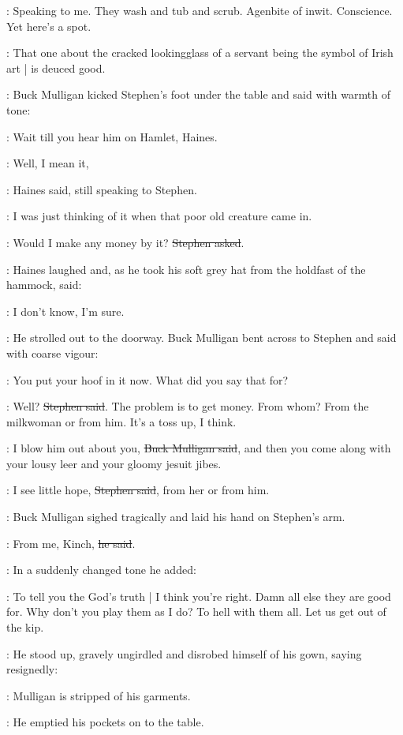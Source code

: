 \StephenInt:
Speaking to me.
They wash and tub and scrub.
Agenbite of inwit.
Conscience.
Yet here's a spot.

\Haines:
That one about the cracked lookingglass of a servant
being the symbol of Irish art |
is deuced good.

:
Buck Mulligan kicked Stephen's foot under the table
and said with warmth of tone:

\Mulligan:
Wait till you hear him on Hamlet, Haines.

\Haines:
Well, I mean it,

:
Haines said, still speaking to Stephen.

\Haines:
I was just thinking of it when that poor old creature came in.

\Stephen:
Would I make any money by it?
\sout{Stephen asked}.

:
Haines laughed
and, as he took his soft grey hat from the holdfast of the hammock,
said:

\Haines:
I don't know, I'm sure.

:
He strolled out to the doorway.
Buck Mulligan bent across to Stephen
and said with coarse vigour:

\Mulligan:
You put your hoof in it now.
What did you say that for?

\Stephen:
Well?
\sout{Stephen said}.
The problem is to get money.
From whom?
From the milkwoman or from him.
It's a toss up, I think.

\Mulligan:
I blow him out about you,
\sout{Buck Mulligan said},
and then you come along
with your lousy leer and your gloomy jesuit jibes.

\Stephen:
I see little hope,
\sout{Stephen said},
from her or from him.

:
Buck Mulligan sighed tragically and laid his hand on Stephen's arm.

\Mulligan:
From me, Kinch,
\sout{he said}.

:
In a suddenly changed tone he added:

\Mulligan:
To tell you the God's truth |
I think you're right.
Damn all else they are good for.
Why don't you play them as I do?
To hell with them all.
Let us get out of the kip.

:
He stood up,
gravely ungirdled and disrobed himself of his gown,
saying resignedly:

\Mulligan:
Mulligan is stripped of his garments.

:
He emptied his pockets on to the table.

